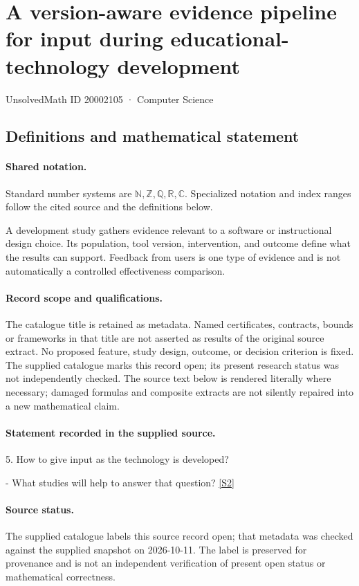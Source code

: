 \documentclass[11pt]{article}
\newcommand{\sref}[2]{\hyperlink{source:#1:#2}{[S#2]}}
\begin{document}
\setcounter{section}{20002104}
\section{A version-aware evidence pipeline for input during educational-technology development}\label{20002105}
{\small\sffamily UnsolvedMath ID 20002105 · Computer Science}
\subsection{Definitions and mathematical statement}

\paragraph{Shared notation.}Standard number systems are $\mathbb N,\mathbb Z,\mathbb Q,\mathbb R,\mathbb C$. Specialized notation and index ranges follow the cited source and the definitions below.


A development study gathers evidence relevant to a software or instructional design choice. Its population, tool version, intervention, and outcome define what the results can support. Feedback from users is one type of evidence and is not automatically a controlled effectiveness comparison.
\paragraph{Record scope and qualifications.}
The catalogue title is retained as metadata. Named certificates, contracts, bounds or frameworks in that title are not asserted as results of the original source extract.
No proposed feature, study design, outcome, or decision criterion is fixed. The supplied catalogue marks this record open; its present research status was not independently checked.
The source text below is rendered literally where necessary; damaged formulas and composite extracts are not silently repaired into a new mathematical claim.
\paragraph{Statement recorded in the supplied source.}
5. How to give input as the technology is developed?

- What studies will help to answer that question? \sref{20002105}{2}
\paragraph{Source status.}
The supplied catalogue labels this source record open; that metadata was checked against the supplied snapshot on 2026-10-11. The label is preserved for provenance and is not an independent verification of present open status or mathematical correctness.
\end{document}
